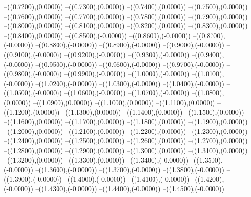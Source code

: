 {	--({\sx*(0.7200)},{\sy*(0.0000)})
	--({\sx*(0.7300)},{\sy*(0.0000)})
	--({\sx*(0.7400)},{\sy*(0.0000)})
	--({\sx*(0.7500)},{\sy*(0.0000)})
	--({\sx*(0.7600)},{\sy*(0.0000)})
	--({\sx*(0.7700)},{\sy*(0.0000)})
	--({\sx*(0.7800)},{\sy*(0.0000)})
	--({\sx*(0.7900)},{\sy*(0.0000)})
	--({\sx*(0.8000)},{\sy*(0.0000)})
	--({\sx*(0.8100)},{\sy*(0.0000)})
	--({\sx*(0.8200)},{\sy*(0.0000)})
	--({\sx*(0.8300)},{\sy*(0.0000)})
	--({\sx*(0.8400)},{\sy*(0.0000)})
	--({\sx*(0.8500)},{\sy*(-0.0000)})
	--({\sx*(0.8600)},{\sy*(-0.0000)})
	--({\sx*(0.8700)},{\sy*(-0.0000)})
	--({\sx*(0.8800)},{\sy*(-0.0000)})
	--({\sx*(0.8900)},{\sy*(-0.0000)})
	--({\sx*(0.9000)},{\sy*(-0.0000)})
	--({\sx*(0.9100)},{\sy*(-0.0000)})
	--({\sx*(0.9200)},{\sy*(-0.0000)})
	--({\sx*(0.9300)},{\sy*(-0.0000)})
	--({\sx*(0.9400)},{\sy*(-0.0000)})
	--({\sx*(0.9500)},{\sy*(-0.0000)})
	--({\sx*(0.9600)},{\sy*(-0.0000)})
	--({\sx*(0.9700)},{\sy*(-0.0000)})
	--({\sx*(0.9800)},{\sy*(-0.0000)})
	--({\sx*(0.9900)},{\sy*(-0.0000)})
	--({\sx*(1.0000)},{\sy*(-0.0000)})
	--({\sx*(1.0100)},{\sy*(-0.0000)})
	--({\sx*(1.0200)},{\sy*(-0.0000)})
	--({\sx*(1.0300)},{\sy*(-0.0000)})
	--({\sx*(1.0400)},{\sy*(-0.0000)})
	--({\sx*(1.0500)},{\sy*(-0.0000)})
	--({\sx*(1.0600)},{\sy*(-0.0000)})
	--({\sx*(1.0700)},{\sy*(-0.0000)})
	--({\sx*(1.0800)},{\sy*(0.0000)})
	--({\sx*(1.0900)},{\sy*(0.0000)})
	--({\sx*(1.1000)},{\sy*(0.0000)})
	--({\sx*(1.1100)},{\sy*(0.0000)})
	--({\sx*(1.1200)},{\sy*(0.0000)})
	--({\sx*(1.1300)},{\sy*(0.0000)})
	--({\sx*(1.1400)},{\sy*(0.0000)})
	--({\sx*(1.1500)},{\sy*(0.0000)})
	--({\sx*(1.1600)},{\sy*(0.0000)})
	--({\sx*(1.1700)},{\sy*(0.0000)})
	--({\sx*(1.1800)},{\sy*(0.0000)})
	--({\sx*(1.1900)},{\sy*(0.0000)})
	--({\sx*(1.2000)},{\sy*(0.0000)})
	--({\sx*(1.2100)},{\sy*(0.0000)})
	--({\sx*(1.2200)},{\sy*(0.0000)})
	--({\sx*(1.2300)},{\sy*(0.0000)})
	--({\sx*(1.2400)},{\sy*(0.0000)})
	--({\sx*(1.2500)},{\sy*(0.0000)})
	--({\sx*(1.2600)},{\sy*(0.0000)})
	--({\sx*(1.2700)},{\sy*(0.0000)})
	--({\sx*(1.2800)},{\sy*(0.0000)})
	--({\sx*(1.2900)},{\sy*(0.0000)})
	--({\sx*(1.3000)},{\sy*(0.0000)})
	--({\sx*(1.3100)},{\sy*(0.0000)})
	--({\sx*(1.3200)},{\sy*(0.0000)})
	--({\sx*(1.3300)},{\sy*(0.0000)})
	--({\sx*(1.3400)},{\sy*(-0.0000)})
	--({\sx*(1.3500)},{\sy*(-0.0000)})
	--({\sx*(1.3600)},{\sy*(-0.0000)})
	--({\sx*(1.3700)},{\sy*(-0.0000)})
	--({\sx*(1.3800)},{\sy*(-0.0000)})
	--({\sx*(1.3900)},{\sy*(-0.0000)})
	--({\sx*(1.4000)},{\sy*(-0.0000)})
	--({\sx*(1.4100)},{\sy*(-0.0000)})
	--({\sx*(1.4200)},{\sy*(-0.0000)})
	--({\sx*(1.4300)},{\sy*(-0.0000)})
	--({\sx*(1.4400)},{\sy*(-0.0000)})
	--({\sx*(1.4500)},{\sy*(-0.0000)})
}
